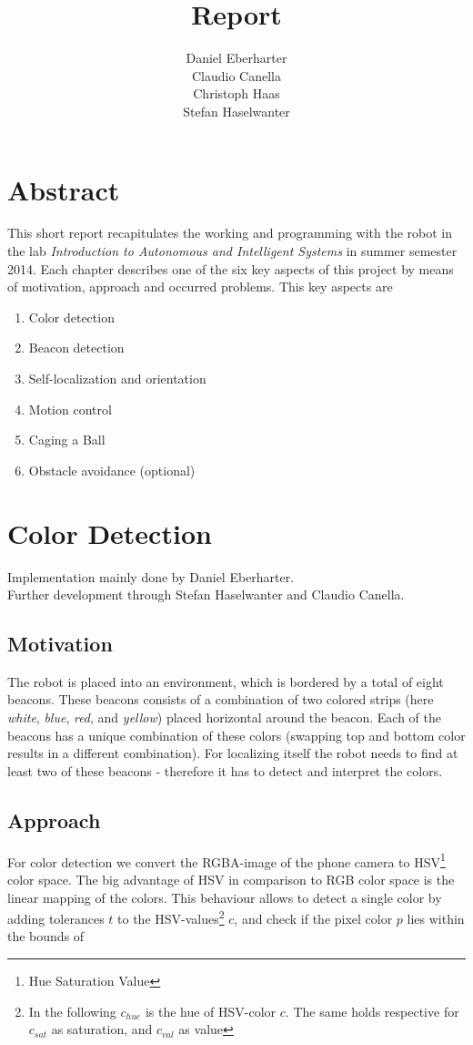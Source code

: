 \documentclass[703031]{iisreport}
\title{\textbf{Report}}
\author{Daniel Eberharter\\ Claudio Canella\\ Christoph Haas\\ Stefan Haselwanter}
\begin{document}
\maketitle

\section{Abstract}
This short report recapitulates the working and programming with the robot in the lab \emph{Introduction to Autonomous and Intelligent Systems} in summer semester 2014. Each chapter describes one of the six key aspects of this project by means of motivation, approach and occurred problems. This key aspects are
\begin{enumerate}
	\item Color detection
	\item Beacon detection
	\item Self-localization and orientation
	\item Motion control
	\item Caging a Ball
	\item Obstacle avoidance (optional)
\end{enumerate}

\section{Color Detection}
Implementation mainly done by Daniel Eberharter.\\
Further development through Stefan Haselwanter and Claudio Canella.

\subsection{Motivation}
The robot is placed into an environment, which is bordered by a total of eight beacons. These beacons consists of a combination of two colored strips (here \emph{white}, \emph{blue}, \emph{red}, and \emph{yellow}) placed horizontal around the beacon. Each of the beacons has a unique combination of these colors (swapping top and bottom color results in a different combination).
For localizing itself the robot needs to find at least two of these beacons - therefore it has to detect and interpret the colors.

\subsection{Approach}
For color detection we convert the RGBA-image of the phone camera to HSV\footnote{Hue Saturation Value} color space. The big advantage of HSV in comparison to RGB color space is the linear mapping of the colors. This behaviour allows to detect a single color by adding tolerances $t$ to the HSV-values\footnote{In the following $c_{hue}$ is the hue of HSV-color $c$. The same holds respective for $c_{sat}$ as saturation, and $c_{val}$ as value} $c$, and check if the pixel color $p$ lies within the bounds of 
\end{document}
